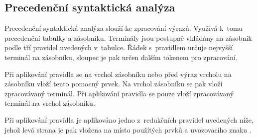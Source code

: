 \documentclass[a4paper, 11pt]{article}
\begin{document}
    \newpage

    \subsection{Precedenční syntaktická analýza}
    \label{sec:precedence_table}

    Precedenční syntaktická analýza slouží ke zpracování výrazů. Využívá k~tomu precedenční tabulky a zásobníku.
    Terminály jsou postupně vkládány na zásobník podle tří pravidel uvedených v~tabulce. Řádek s~pravidlem
    určuje nejvyšší terminál na zásobníku, sloupec je pak určen dalším tokenem pro zpracování.

    Při aplikování pravidla \uv{\texttt{<}} se na vrchol zásobníku nebo před výraz vrcholu na zásobníku
    vloží tento pomocný prvek. Na vrchol zásobníku se pak vloží zpracovávaný terminál.
    Při aplikování pravidla \uv{\texttt{=}} se pouze vloží zpracovávaný terminál na vrchol zásobníku.

    Při aplikování pravidla \uv{\texttt{>}} je aplikováno jedno z~redukčních pravidel uvedených níže,
    jehož levá strana je pak vložena na místo použítých prvků a uvozovacího znaku \uv{\texttt{<}}.
\end{document}
